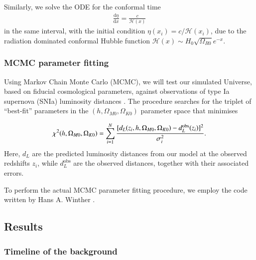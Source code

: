 \documentclass[twocolumn]{aa}
\renewcommand{\d}{\text{d}}
\newcommand{\dd}[2]{\frac{\d #1}{\d #2}}
\begin{document}
Similarly, we solve the ODE for the conformal time 
\begin{align*}
      \dd{\eta}{x} = \frac{c}{\mathcal{H}(x)}
\end{align*}
in the same interval, with the initial condition $\eta(x_i)=c/\mathcal{H}(x_i)$, due to the radiation dominated conformal Hubble function $\mathcal{H}(x) \sim H_0\sqrt{\Omega_{R0}}e^{-x}$.

\subsubsection{MCMC parameter fitting}
\label{mile1:imp:MCMC}
Using Markov Chain Monte Carlo (MCMC), we will test our simulated Universe, based on fiducial cosmological parameters, against observations of type Ia supernova (SNIa) luminosity distances \citep{Betoule_2014}. The procedure searches for the triplet of ``best-fit'' parameters in the $(h,\Omega_{M0}, \Omega_{K0})$ parameter space that minimises

\begin{equation*}
      \chi^2(h,\Omega_{M0}, \Omega_{K0}) = \sum_{i=1}^N \frac{[d_L(z_i,h,\Omega_{M0},\Omega_{K0}) - d_L^{\rm obs}(z_i)]^2 }{\sigma_i^2}.
\end{equation*}
Here, $d_L$ are the predicted luminosity distances from our model at the observed redshifts $z_i$, while $d_L^\text{obs}$ are the observed distances, together with their associated errors.

To perform the actual MCMC parameter fitting procedure, we employ the code written by Hans A. Winther \citep{winther_supernova}.


\subsection{Results}

\subsubsection{Timeline of the background}
\end{document}
